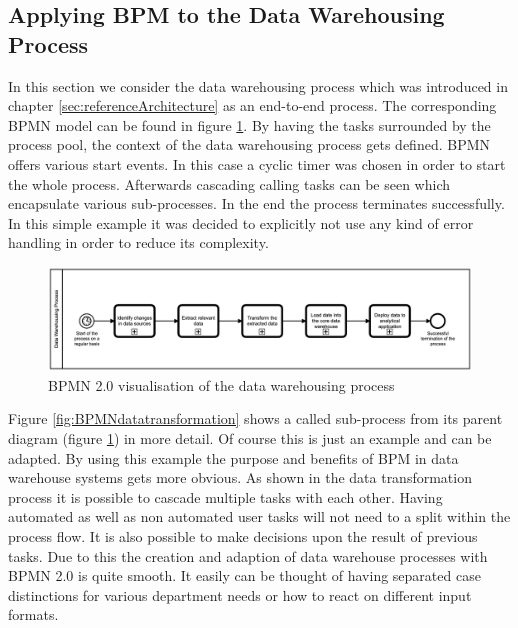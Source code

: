 \subsection{Applying BPM to the Data Warehousing Process}
In this section we consider the data warehousing process which was introduced in chapter \ref{sec:referenceArchitecture} as an end-to-end process. The corresponding BPMN model can be found in figure \ref{fig:BPMNdatawarehousing}.\newline
By having the tasks surrounded by the process pool, the context of the data warehousing process gets defined. BPMN offers various start events. In this case a cyclic timer was chosen in order to start the whole process. Afterwards cascading calling tasks can be seen which encapsulate various sub-processes. In the end the process terminates successfully. In this simple example it was decided to explicitly not use any kind of error handling in order to reduce its complexity.\newline
\\
\begin{figure}[!htb]
    \centering
    \includegraphics[scale=0.15]{pictures/DataWarehousingProcess.png}
    \caption{BPMN 2.0 visualisation of the data warehousing process}
    \label{fig:BPMNdatawarehousing}
\end{figure}
Figure \ref{fig:BPMNdatatransformation} shows a called sub-process from its parent diagram (figure \ref{fig:BPMNdatawarehousing}) in more detail. Of course this is just an example and can be adapted. By using this example the purpose and benefits of BPM in data warehouse systems gets more obvious.\newline
As shown in the data transformation process it is possible to cascade multiple tasks with each other. Having automated as well as non automated user tasks will not need to a split within the process flow. It is also possible to make decisions upon the result of previous tasks. Due to this the creation and adaption of data warehouse processes with BPMN 2.0 is quite smooth. It easily can be thought of having separated case distinctions for various department needs or how to react on different input formats.\newline 

